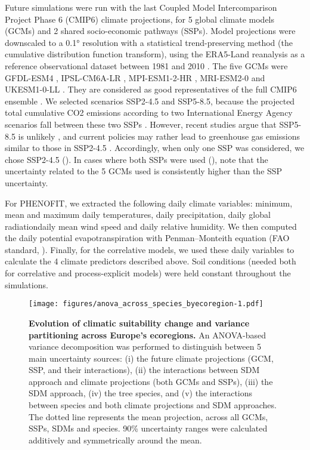 \documentclass[letterpaper,8pt]{extarticle}  %
\begin{document}
\begin{doublespacing}
\begin{linenumbers}
Future simulations were run with the last Coupled Model Intercomparison Project Phase 6 (CMIP6) climate  projections, for 5 global climate models (GCMs) and 2 shared socio-economic pathways (SSPs). 
Model projections were downscaled to a 0.1° resolution with a statistical trend-preserving method (the cumulative distribution function transform), using the ERA5-Land reanalysis as a reference observational dataset between 1981 and 2010 \citep{Noel2022}. The five GCMs were GFDL-ESM4 \citep{Dunne2020}, IPSL-CM6A-LR \citep{Lurton2020}, MPI-ESM1-2-HR \citep{Mueller2018}, MRI-ESM2-0 \citep{Yukimoto2019} and UKESM1-0-LL \citep{Sellar2020}. They are considered as good representatives of the full CMIP6 ensemble \citep{Noel2022}. We selected scenarios SSP2-4.5 and SSP5-8.5, because the projected total cumulative CO2 emissions according to two International Energy Agency scenarios fall between these two SSPs \citep{Schwalm2020}. However, recent studies argue that SSP5-8.5 is unlikely \citep{Hausfather2020}, and current policies may rather lead to greenhouse gas emissions similar to those in SSP2-4.5 \citep{Gillett2024}. Accordingly, when only one SSP was considered, we chose SSP2-4.5 (). In cases where both SSPs were used (), note that the uncertainty related to the 5 GCMs used is consistently higher than the SSP uncertainty.

For PHENOFIT, we extracted the following daily climate variables: minimum, mean and maximum daily temperatures, daily precipitation, daily global radiationdaily mean wind speed and daily relative humidity. We then computed the daily potential evapotranspiration with Penman–Monteith equation (FAO standard, \citealp{Allen1998}). Finally, for the correlative models, we used these daily variables to calculate the 4 climate predictors described above.  Soil conditions (needed both for correlative and process-explicit models) were held constant throughout the simulations.

\begin{figure}
\vspace*{-1.5cm}
\centering
\texttt{[image: figures/anova\_across\_species\_byecoregion-1.pdf]}
\caption{\textbf{Evolution of climatic suitability change and variance partitioning across Europe's ecoregions.} An ANOVA-based variance decomposition was performed to distinguish between 5 main uncertainty sources: (i) the future climate projections (GCM, SSP, and their interactions), (ii) the interactions between SDM approach and climate projections (both GCMs and SSPs), (iii) the SDM approach, (iv) the tree species, and (v) the interactions between species and both climate projections and SDM approaches. The dotted line represents the mean projection, across all GCMs, SSPs, SDMs and species. 90\% uncertainty ranges were calculated additively and symmetrically around the mean.}
\label{fig:anovaecoregions}
\end{figure}


\end{linenumbers}
\end{doublespacing}
\end{document}
